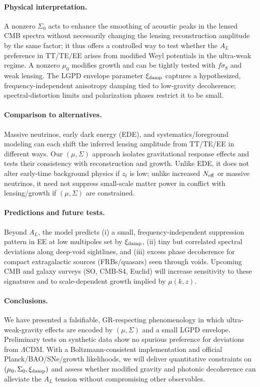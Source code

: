 \label{sec:discussion}

\paragraph{Physical interpretation.}
A nonzero $\Sigma_0$ acts to enhance the smoothing of acoustic peaks in the lensed CMB spectra without necessarily changing the lensing reconstruction amplitude by the same factor; it thus offers a controlled way to test whether the $A_L$ preference in TT/TE/EE arises from modified Weyl potentials in the ultra-weak regime. A nonzero $\mu_0$ modifies growth and can be tightly tested with $f\sigma_8$ and weak lensing. The LGPD envelope parameter $\xi_{\rm damp}$ captures a hypothesized, frequency-independent anisotropy damping tied to low-gravity decoherence; spectral-distortion limits and polarization phases restrict it to be small.

\paragraph{Comparison to alternatives.}
Massive neutrinos, early dark energy (EDE), and systematics/foreground modeling can each shift the inferred lensing amplitude from TT/TE/EE in different ways. Our $(\mu,\Sigma)$ approach isolates gravitational response effects and tests their consistency with reconstruction and growth. Unlike EDE, it does not alter early-time background physics if $z_t$ is low; unlike increased $N_{\rm eff}$ or massive neutrinos, it need not suppress small-scale matter power in conflict with lensing/growth if $(\mu,\Sigma)$ are constrained.

\paragraph{Predictions and future tests.}
Beyond $A_L$, the model predicts (i) a small, frequency-independent suppression pattern in EE at low multipoles set by $\xi_{\rm damp}$, (ii) tiny but correlated spectral deviations along deep-void sightlines, and (iii) excess phase decoherence for compact extragalactic sources (FRBs/quasars) seen through voids. Upcoming CMB and galaxy surveys (SO, CMB-S4, Euclid) will increase sensitivity to these signatures and to scale-dependent growth implied by $\mu(k,z)$.

\paragraph{Conclusions.}
We have presented a falsifiable, GR-respecting phenomenology in which ultra-weak-gravity effects are encoded by $(\mu,\Sigma)$ and a small LGPD envelope. Preliminary tests on synthetic data show no spurious preference for deviations from $\Lambda$CDM. With a Boltzmann-consistent implementation and official Planck/BAO/SNe/growth likelihoods, we will deliver quantitative constraints on $(\mu_0,\Sigma_0,\xi_{\rm damp})$ and assess whether modified gravity and photonic decoherence can alleviate the $A_L$ tension without compromising other observables.
